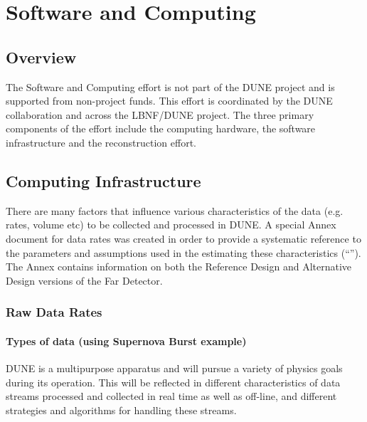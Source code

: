 \chapter{Software and Computing}
\label{ch:detectors-sc}

\section{Overview}

The Software and Computing effort is not part of the DUNE project and
is supported from non-project funds. This effort is coordinated by the
DUNE collaboration and across the LBNF/DUNE project. The three primary
components of the effort include the computing hardware, the software
infrastructure and the reconstruction effort.

\section{Computing Infrastructure}
\label{sec:detectors-sc-infrastructure}

There are many factors that influence various characteristics of the
data (e.g. rates, volume etc) to be collected and processed in DUNE.
A special Annex document for data rates was created in order to
provide a systematic reference to the parameters and assumptions used
in the estimating these characteristics (``\anxrates'').  The Annex
contains information on both the Reference Design and Alternative
Design versions of the Far Detector.

\subsection{Raw Data Rates}
\label{sec:detectors-sc-infrastructure-data-rates}


\subsubsection{Types of data (using Supernova Burst example)}
DUNE is a multipurpose apparatus and will pursue a variety of physics goals during its operation.
This will be reflected in different
characteristics of data streams processed and collected in real time
as well as off-line, and different strategies and algorithms for handling
these streams.

